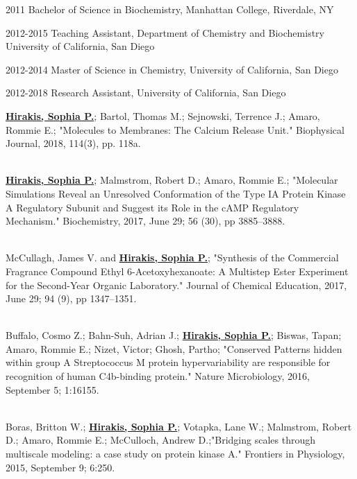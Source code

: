\documentclass[12pt]{ucsddissertation}
\begin{document}
\begin{vita}
\noindent
\begin{cv}{}
\begin{cvlist}{}
\item[2011] Bachelor of Science in Biochemistry, Manhattan College, Riverdale, NY
\item[2012-2015] Teaching Assistant, Department of Chemistry and Biochemistry\\University of California, San Diego
\item[2012-2014] Master of Science in Chemistry, University of California, San
Diego
\item[2012-2018] Research Assistant, University of California, San
Diego

\end{cvlist}
\end{cv}


\publications

\noindent \textbf{\underline{Hirakis, Sophia P.}}; Bartol, Thomas M.; Sejnowski, Terrence J.; Amaro, Rommie E.; "Molecules to Membranes: The Calcium Release Unit." Biophysical Journal, 2018, 114(3),  pp. 118a.

\noindent \\ \textbf{\underline{Hirakis, Sophia P.}}; Malmstrom, Robert D.; Amaro, Rommie E.; "Molecular Simulations Reveal an Unresolved Conformation of the Type IA Protein Kinase A Regulatory Subunit and Suggest its Role in the cAMP Regulatory Mechanism." Biochemistry, 2017, June 29; 56 (30), pp 3885–3888.

\noindent \\McCullagh, James V. and \textbf{\underline{Hirakis, Sophia P.}}; "Synthesis of the Commercial Fragrance Compound Ethyl 6-Acetoxyhexanoate: A Multistep Ester Experiment for the Second-Year Organic Laboratory." Journal of Chemical Education, 2017, June 29; 94 (9), pp 1347–1351.

\noindent \\Buffalo, Cosmo Z.; Bahn-Suh, Adrian J.; \textbf{\underline{Hirakis, Sophia P.}}; Biswas, Tapan; Amaro, Rommie E.; Nizet, Victor; Ghosh, Partho; "Conserved Patterns hidden within group A Streptococcus M protein hypervariability are responsible for recognition of human C4b-binding protein." Nature Microbiology, 2016, September 5; 1:16155.

\noindent \\Boras, Britton W.; \textbf{\underline{Hirakis, Sophia P.}}; Votapka, Lane W.; Malmstrom, Robert D.; Amaro, Rommie E.; McCulloch, Andrew D.;"Bridging scales through multiscale modeling: a case study on protein kinase A." Frontiers in Physiology, 2015, September 9; 6:250. 
\vspace{5mm}



\end{vita}
\end{document}
